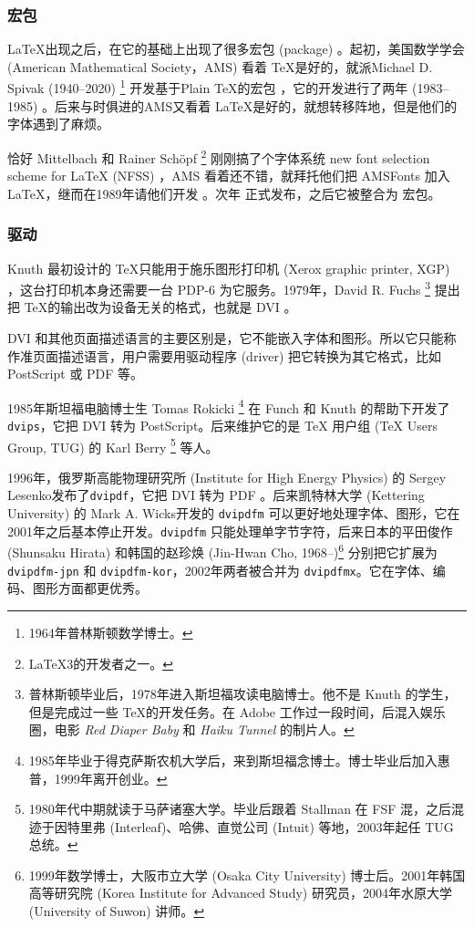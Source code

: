 \subsubsection{宏包}

\LaTeX 出现之后，在它的基础上出现了很多宏包 (package) 。起初，美国数学学会 (American Mathematical Society，AMS)\indexAMS{} 看着 \TeX 是好的，就派Michael D. Spivak (1940--2020)\indexSpivak{} \footnote{1964年普林斯顿数学博士。} 开发基于Plain \TeX 的宏包 \AmSTeX，它的开发进行了两年 (1983--1985) 。后来与时俱进的AMS又看着 \LaTeX 是好的，就想转移阵地，但是他们的字体遇到了麻烦。

恰好 Mittelbach 和 Rainer Schöpf\indexSchopf{} \footnote{\LaTeX 3的开发者之一。} 刚刚搞了个字体系统 new font selection scheme for \LaTeX{} (NFSS) ，AMS 看着还不错，就拜托他们把 AMSFonts 加入 \LaTeX，继而在1989年请他们开发 \AmSLaTeX。次年 \AmSLaTeX 正式发布，之后它被整合为 \AmS 宏包。

\subsubsection{驱动}

Knuth 最初设计的 \TeX 只能用于施乐图形打印机 (Xerox graphic printer, XGP) ，这台打印机本身还需要一台 PDP-6 为它服务。1979年，David R. Fuchs\indexFuchs{} \footnote{普林斯顿毕业后，1978年进入斯坦福攻读电脑博士。他不是 Knuth 的学生，但是完成过一些 \TeX 的开发任务。在 Adobe 工作过一段时间，后混入娱乐圈，电影 \emph{Red Diaper Baby} 和 \emph{Haiku Tunnel} 的制片人。} 提出把 \TeX 的输出改为设备无关的格式，也就是 DVI 。

DVI 和其他页面描述语言的主要区别是，它不能嵌入字体和图形。所以它只能称作准页面描述语言，用户需要用驱动程序 (driver) 把它转换为其它格式，比如 PostScript 或 PDF 等。

1985年斯坦福电脑博士生 Tomas Rokicki\indexRokicki{} \footnote{1985年毕业于得克萨斯农机大学后，来到斯坦福念博士。博士毕业后加入惠普，1999年离开创业。} 在 Funch 和 Knuth 的帮助下开发了\texttt{dvips}，它把 DVI 转为 PostScript。后来维护它的是 TeX 用户组 (TeX Users Group, TUG)\indexTUG{} 的 Karl Berry\indexBerry{} \footnote{1980年代中期就读于马萨诸塞大学。毕业后跟着 Stallman 在 FSF 混，之后混迹于因特里弗 (Interleaf)、哈佛、直觉公司 (Intuit) 等地，2003年起任 TUG 总统。} 等人。

1996年，俄罗斯高能物理研究所 (Institute for High Energy Physics) 的 Sergey Lesenko\indexLesenko 发布了\texttt{dvipdf}，它把 DVI 转为 PDF 。后来凯特林大学 (Kettering University) 的 Mark A. Wicks\indexWicks 开发的 \texttt{dvipdfm} 可以更好地处理字体、图形，它在2001年之后基本停止开发。\texttt{dvipdfm} 只能处理单字节字符，后来日本的平田俊作 (Shunsaku Hirata)\indexHirata{} 和韩国的赵珍焕 (Jin-Hwan Cho, 1968--)\indexCho{}\footnote{1999年数学博士，大阪市立大学 (Osaka City University) 博士后。2001年韩国高等研究院 (Korea Institute for Advanced Study) 研究员，2004年水原大学 (University of Suwon) 讲师。} 分别把它扩展为 \texttt{dvipdfm-jpn} 和 \texttt{dvipdfm-kor}，2002年两者被合并为 \texttt{dvipdfmx}。它在字体、编码、图形方面都更优秀。


